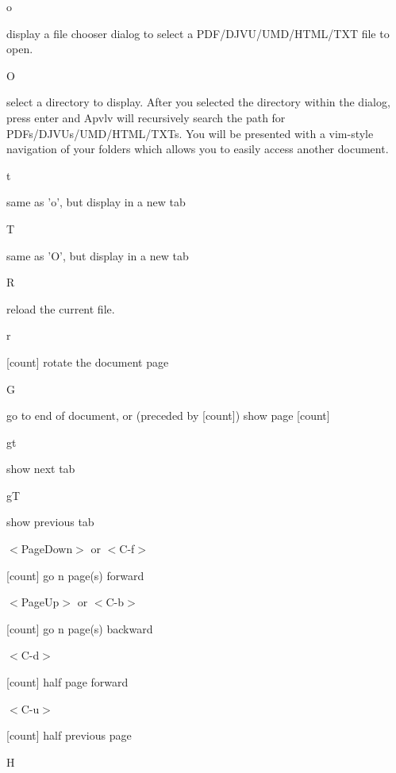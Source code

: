 \documentclass[a4paper,12pt]{article}
\newcommand{\apvlv}{\textsf{Apvlv{ }}}
\begin{document}
\begin{description}

\item o

display a file chooser dialog to select a PDF/\-DJVU/\-UMD/\-HTML/\-TXT file to open.

\item O

select a directory to display. After you selected the directory within the dialog, press enter and \apvlv will recursively search the path for PDFs/DJVUs/UMD/HTML/TXTs. You will be presented with a vim-style navigation of your folders which allows you to easily access another document.

\item t

same as 'o', but display in a new tab

\item T

same as 'O', but display in a new tab

\item R

reload the current file.

\item r

[count] rotate the document page 

\item G

  go to end of document, or (preceded by [count]) show page [count]

\item gt

show next tab

\item gT

show previous tab

\item $<$PageDown$>$ or $<$C-f$>$

[count] go n page(s) forward

\item $<$PageUp$>$ or
$<$C-b$>$

[count] go n page(s) backward

\item $<$C-d$>$

[count] half page forward

\item $<$C-u$>$

[count] half previous page 

\item H


\end{description}
\end{document}
